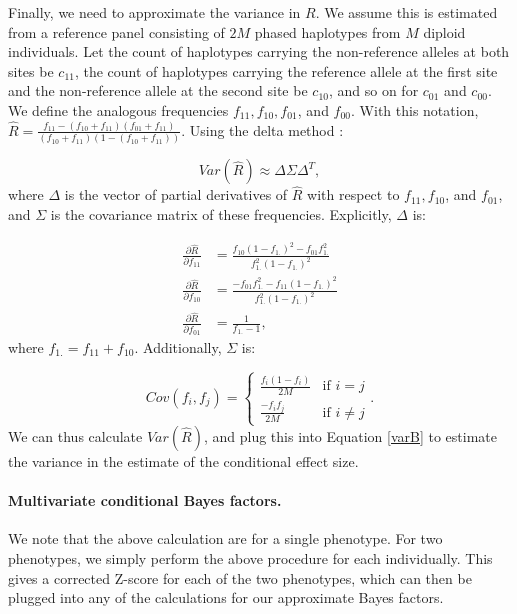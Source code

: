 \documentclass[11pt,titlepage]{article}
\begin{document}
Finally, we need to approximate the variance in $R$. We assume this is estimated from a reference panel consisting of $2M$ phased haplotypes from $M$ diploid individuals. Let the count of haplotypes carrying the non-reference alleles at both sites be $c_{11}$, the count of haplotypes carrying the reference allele at the first site and the non-reference allele at the second site be $c_{10}$, and so on for $c_{01}$ and $c_{00}$. We define the analogous frequencies $f_{11}, f_{10}, f_{01}$, and $f_{00}$. With this notation, $\hat R = \frac{f_{11} - (f_{10}+f_{11})(f_{01}+f_{11})}{ (f_{10}+f_{11})(1-(f_{10}+f_{11}))}$.   Using the delta method \citep{Agresti:2002vk}:  

\begin{equation}
Var (\hat R) \approx \Delta \Sigma \Delta^{T},
\end{equation} 
\noindent where $\Delta$ is the vector of partial derivatives of $\hat R$ with respect to $f_{11}, f_{10}$, and  $f_{01}$, and $\Sigma$ is the covariance matrix of these frequencies. Explicitly, $\Delta$ is:

\begin{align}
\frac{\partial \hat R}{\partial f_{11}} &= \frac{f_{10} (1-f_{1.})^2 - f_{01} f_{1.}^2}{f_{1.}^2 (1-f_{1.})^2}  \\
 \frac{\partial \hat R}{\partial f_{10}} &= \frac{-f_{01}f_{1.}^2 - f_{11} (1-f_{1.})^2}{f_{1.}^2 (1-f_{1.})^2}\\
 \frac{\partial \hat R}{\partial f_{01}} &= \frac{1}{f_{1.}-1}, 
\end{align}
\noindent where $f_{1.} = f_{11}+f_{10}$. Additionally, $\Sigma$ is:

\begin{equation}
Cov(f_i, f_j) =
  \begin{cases}
   \frac{f_i (1-f_i)}{2M} & \text{if } i = j \\
   \frac{- f_i f_j}{2M}       & \text{if } i \ne j
  \end{cases}.
\end{equation}
We can thus calculate $Var(\hat R)$, and plug this into Equation \ref{varB} to estimate the variance in the estimate of the conditional effect size. 
\paragraph{Multivariate conditional Bayes factors.} We note that the above calculation are for a single phenotype. For two phenotypes, we simply perform the above procedure for each individually. This gives a corrected Z-score for each of the two phenotypes, which can then be plugged into any of the calculations for our approximate Bayes factors. 
\end{document}
